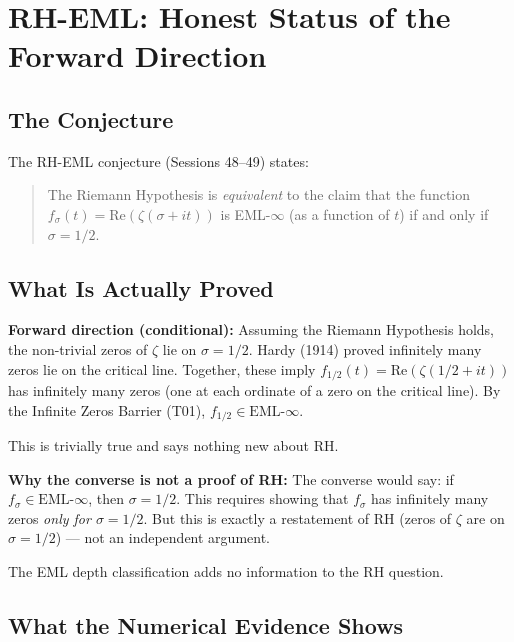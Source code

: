 
\section*{RH-EML: Honest Status of the Forward Direction}

\subsection*{The Conjecture}

The RH-EML conjecture (Sessions 48--49) states:
\begin{quote}
The Riemann Hypothesis is \emph{equivalent} to the claim that the function
$f_\sigma(t) = \mathrm{Re}(\zeta(\sigma + it))$ is EML-$\infty$ (as a
function of $t$) if and only if $\sigma = 1/2$.
\end{quote}

\subsection*{What Is Actually Proved}

\textbf{Forward direction (conditional):}
Assuming the Riemann Hypothesis holds, the non-trivial zeros of $\zeta$
lie on $\sigma = 1/2$. Hardy (1914) proved infinitely many zeros lie
on the critical line. Together, these imply $f_{1/2}(t) = \mathrm{Re}(\zeta(1/2+it))$
has infinitely many zeros (one at each ordinate of a zero on the critical line).
By the Infinite Zeros Barrier (T01), $f_{1/2} \in \mathrm{EML}\text{-}\infty$.

This is trivially true and says nothing new about RH.

\textbf{Why the converse is not a proof of RH:}
The converse would say: if $f_\sigma \in \mathrm{EML}\text{-}\infty$, then
$\sigma = 1/2$.  This requires showing that $f_\sigma$ has infinitely many
zeros \emph{only for $\sigma = 1/2$}.  But this is exactly a restatement
of RH (zeros of $\zeta$ are on $\sigma=1/2$) --- not an independent argument.

The EML depth classification adds no information to the RH question.

\subsection*{What the Numerical Evidence Shows}

